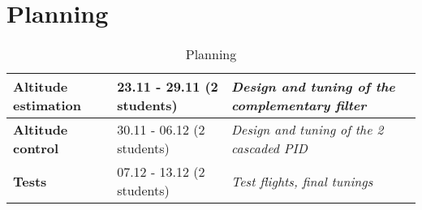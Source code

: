 \documentclass{repMobRob}
\begin{document}
\section{Planning}
\begin{table}[H]
	\centering
	\caption{Planning}
	\label{tab:planning}
	\begin{tabular}{|l|l|l|}
		\hline
		\textbf{Altitude estimation} & 23.11 - 29.11 (2 students) & \textit{Design and tuning of the complementary filter} \\ \hline
		\textbf{Altitude control}    & 30.11 - 06.12 (2 students)  & \textit{Design and tuning of the 2 cascaded PID}       \\ \hline
		\textbf{Tests}               & 07.12 - 13.12 (2 students)  & \textit{Test flights, final tunings}                   \\ \hline
	\end{tabular}
\end{table}
\end{document}

